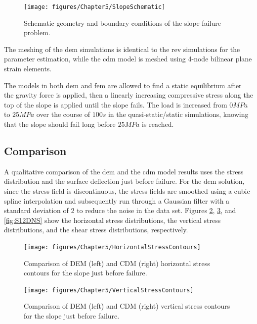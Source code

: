 \begin{figure}[!htb]
\begin{center}
\texttt{[image: figures/Chapter5/SlopeSchematic]}
\caption{{\label{fig:slopeGeom} Schematic geometry and boundary conditions of the slope failure problem.%
}}
\end{center}
\end{figure}

The meshing of the \acrshort{dem} simulations is identical to the \acrshort{rev} simulations for the parameter estimation, while the \acrshort{cdm} model is meshed using 4-node bilinear plane strain elements.

The models in both \acrshort{dem} and \acrshort{fem} are allowed to find a static equilibrium after the gravity force is applied, then a linearly increasing compressive stress along the top of the slope is applied until the slope fails. The load is increased from $0MPa$ to $25 MPa$ over the course of $100s$ in the quasi-static/static simulations, knowing that the slope should fail long before $25MPa$ is reached.

\subsection{ Comparison}

A qualitative comparison of the \acrshort{dem} and the \acrshort{cdm} model results uses the stress distribution and the surface deflection just before failure. For the \acrshort{dem} solution, since the stress field is discontinuous, the stress fields are smoothed using a cubic spline interpolation and subsequently run through a Gaussian filter with a standard deviation of 2 to reduce the noise in the data set. Figures \ref{fig:S11DNS}, \ref{fig:S22DNS}, and \ref{fig:S12DNS} show the horizontal stress distributions, the vertical stress distributions, and the shear stress distributions, respectively.

\begin{figure}[!htb]
\begin{center}
\texttt{[image: figures/Chapter5/HorizontalStressContours]}
\caption{{\label{fig:S11DNS} Comparison of DEM (left) and CDM (right) horizontal stress contours for the slope just before failure.%
}}
\end{center}
\end{figure}

\begin{figure}[!htb]
\begin{center}
\texttt{[image: figures/Chapter5/VerticalStressContours]}
\caption{{\label{fig:S22DNS} Comparison of DEM (left) and CDM (right) vertical stress contours for the slope just before failure.%
}}
\end{center}
\end{figure}

